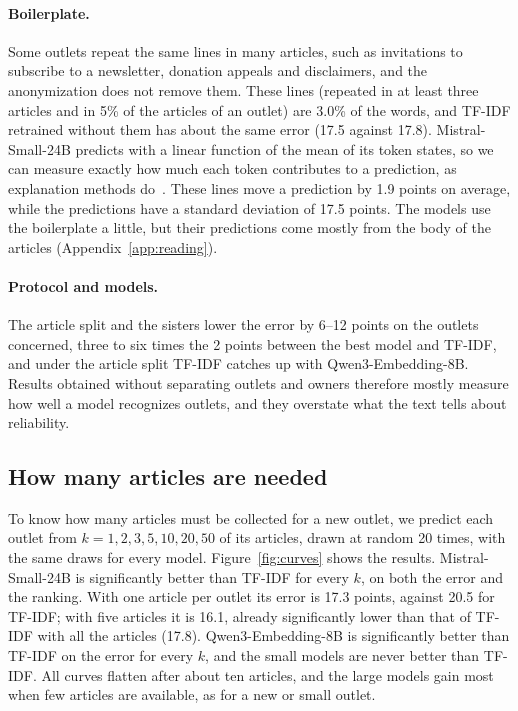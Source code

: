 \documentclass[11pt,a4paper]{article}
\begin{document}
\paragraph{Boilerplate.} Some outlets repeat the same lines in many articles, such as invitations to subscribe to a
newsletter, donation appeals and disclaimers, and the anonymization does not remove them. These lines (repeated in at
least three articles and in 5\% of the articles of an outlet) are 3.0\% of the words, and TF-IDF retrained without them
has about the same error (17.5 against 17.8). Mistral-Small-24B predicts with a linear function of the mean of its token
states, so we can measure exactly how much each token contributes to a prediction, as explanation methods
do~\cite{kozik2024explainability}. These lines move a prediction by 1.9 points on average, while the predictions have a
standard deviation of 17.5 points. The models use the boilerplate a little, but their predictions come mostly from the
body of the articles (Appendix~\ref{app:reading}).

\paragraph{Protocol and models.} The article split and the sisters lower the error by 6--12 points on the outlets
concerned, three to six times the 2 points between the best model and TF-IDF, and under the article split TF-IDF catches
up with Qwen3-Embedding-8B. Results obtained without separating outlets and owners therefore mostly measure how well a
model recognizes outlets, and they overstate what the text tells about reliability.

\subsection{How many articles are needed}\label{sec:k}
To know how many articles must be collected for a new outlet, we predict each outlet from $k = 1, 2, 3, 5, 10, 20, 50$
of its articles, drawn at random 20 times, with the same draws for every model. Figure~\ref{fig:curves} shows the
results. Mistral-Small-24B is significantly better than TF-IDF for every $k$, on both the error and the ranking. With
one article per outlet its error is 17.3 points, against 20.5 for TF-IDF; with five articles it is 16.1, already
significantly lower than that of TF-IDF with all the articles (17.8). Qwen3-Embedding-8B is significantly better than
TF-IDF on the error for every $k$, and the small models are never better than TF-IDF. All curves flatten after about ten
articles, and the large models gain most when few articles are available, as for a new or small outlet.
\end{document}
